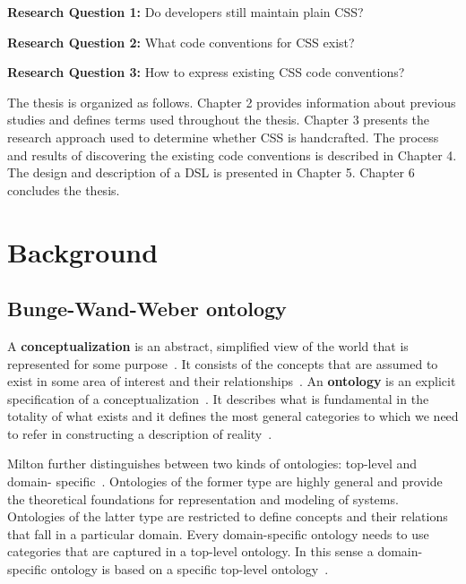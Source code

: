 \documentclass[parskip=full]{uvamscse}
\begin{document}
  \begin{description}
    \item \textbf{Research Question 1:} Do developers still maintain plain CSS?
    \item \textbf{Research Question 2:} What code conventions for CSS exist?
    \item \textbf{Research Question 3:} How to express existing CSS code conventions?
  \end{description}

The thesis is organized as follows. Chapter 2 provides information about previous studies and
defines terms used throughout the thesis. Chapter 3 presents the research approach used to determine
whether CSS is handcrafted. The process and results of discovering the existing code conventions is
described in Chapter 4. The design and description of a DSL is presented in Chapter 5. Chapter 6
concludes the thesis.


\chapter{Background}

\section{Bunge-Wand-Weber ontology}

A \textbf{conceptualization} is an abstract, simplified view of the world that is represented for
some purpose~\cite{gruber1995toward}. It consists of the concepts that are assumed to exist in some
area of interest and their relationships~\cite{gruber1995toward}. An \textbf{ontology} is an
explicit specification of a conceptualization~\cite{gruber1995toward}. It describes what is
fundamental in the totality of what exists and it defines the most general categories to which we
need to refer in constructing a description of reality~\cite{milton2004top}.

Milton further distinguishes between two kinds of ontologies: top-level and domain-
specific~\cite{milton2004top}. Ontologies of the former type are highly general and provide the
theoretical foundations for representation and modeling of systems. Ontologies of the latter type
are restricted to define concepts and their relations that fall in a particular domain. Every
domain-specific ontology needs to use categories that are captured in a top-level ontology. In this
sense a domain-specific ontology is based on a specific top-level ontology~\cite{milton2004top}.
\end{document}
